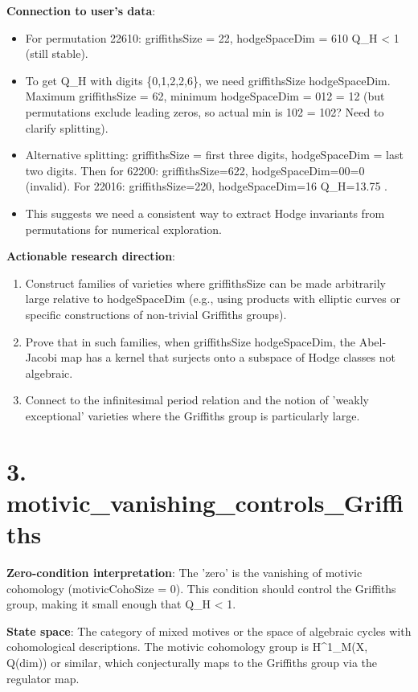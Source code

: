 \documentclass[11pt]{article}
\begin{document}
\textbf{Connection to user's data}:
\begin{itemize}
\item For permutation 22610: griffithsSize = 22, hodgeSpaceDim = 610 \rightarrow Q\_H  < 1 (still stable).
\item To get Q\_H  with digits \{0,1,2,2,6\}, we need griffithsSize \geq hodgeSpaceDim. Maximum griffithsSize = 62, minimum hodgeSpaceDim = 012 = 12 (but permutations exclude leading zeros, so actual min is 102 = 102? Need to clarify splitting).
\item Alternative splitting: griffithsSize = first three digits, hodgeSpaceDim = last two digits. Then for 62200: griffithsSize=622, hodgeSpaceDim=00=0 (invalid). For 22016: griffithsSize=220, hodgeSpaceDim=16 \rightarrow Q\_H=13.75 .
\item This suggests we need a consistent way to extract Hodge invariants from permutations for numerical exploration.
\end{itemize}

\textbf{Actionable research direction}:
\begin{enumerate}
\item Construct families of varieties where griffithsSize can be made arbitrarily large relative to hodgeSpaceDim (e.g., using products with elliptic curves or specific constructions of non-trivial Griffiths groups).
\item Prove that in such families, when griffithsSize \geq hodgeSpaceDim, the Abel-Jacobi map has a kernel that surjects onto a subspace of Hodge classes not algebraic.
\item Connect to the infinitesimal period relation and the notion of 'weakly exceptional' varieties where the Griffiths group is particularly large.
\end{enumerate}

\section{3. motivic\_vanishing\_controls\_Griffiths}

\textbf{Zero-condition interpretation}: The 'zero' is the vanishing of motivic cohomology (motivicCohoSize = 0). This condition should control the Griffiths group, making it small enough that Q\_H < 1.

\textbf{State space}: The category of mixed motives or the space of algebraic cycles with cohomological descriptions. The motivic cohomology group is H^1\_M(X, Q(dim)) or similar, which conjecturally maps to the Griffiths group via the regulator map.
\end{document}
